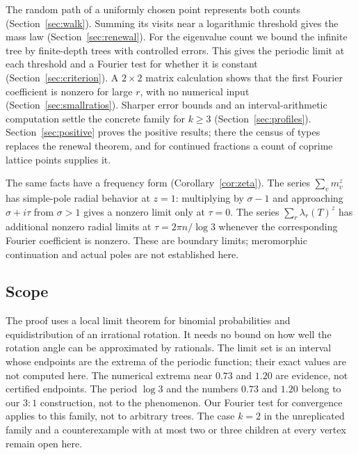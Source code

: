 \documentclass[11pt]{article}
\theoremstyle{definition}
\theoremstyle{remark}
\begin{document}
The random path of a uniformly chosen point represents both counts
(Section~\ref{sec:walk}). Summing its visits near a logarithmic
threshold gives the mass law (Section~\ref{sec:renewal}). For the
eigenvalue count we bound the infinite tree by finite-depth trees with
controlled errors. This gives the periodic limit at each threshold and a
Fourier test for whether it is constant (Section~\ref{sec:criterion}).
A $2\times2$ matrix calculation shows that the first Fourier coefficient
is nonzero for large $r$, with no numerical input
(Section~\ref{sec:smallratios}). Sharper error bounds and an
interval-arithmetic computation settle the concrete family for $k\ge3$
(Section~\ref{sec:profiles}). Section~\ref{sec:positive} proves the
positive results; there the census of types replaces the renewal theorem,
and for continued fractions a count of coprime lattice points supplies it.

The same facts have a frequency form (Corollary~\ref{cor:zeta}).
The series $\sum_vm_v^z$ has simple-pole radial behavior at $z=1$:
multiplying by $\sigma-1$ and approaching $\sigma+i\tau$ from
$\sigma>1$ gives a nonzero limit only at $\tau=0$. The series
$\sum_r\lambda_r(T)^z$ has additional nonzero radial limits at
$\tau=2\pi n/\log3$ whenever the corresponding Fourier coefficient
is nonzero. These are boundary limits; meromorphic continuation and
actual poles are not established here.

\subsection{Scope}
The proof uses a local limit theorem for binomial probabilities and
equidistribution of an irrational rotation. It needs no bound on how
well the rotation angle can be approximated by rationals. The limit set
is an interval whose endpoints are the extrema of the periodic function;
their exact values are not computed here. The numerical extrema near
$0.73$ and $1.20$ are evidence, not certified endpoints. The period
$\log3$ and the numbers $0.73$ and $1.20$ belong to our $3:1$
construction, not to the phenomenon. Our Fourier
test for convergence applies to this family, not to arbitrary trees. The case $k=2$ in the
unreplicated family and a counterexample with at most two or three
children at every vertex remain open here.
\end{document}
